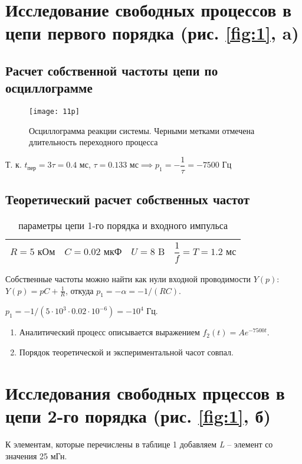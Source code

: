 \documentclass[a4paper,14pt ]{article} %
\begin{document}
\section{Исследование свободных процессов в цепи первого порядка (рис. \ref{fig:1}, a)}
\subsection{Расчет собственной частоты цепи по осциллограмме}
\begin{figure}[H]
    \texttt{[image: 11p]}
    \centering
    \caption{\centering Осциллограмма реакции системы. Черными метками отмечена длительность
    переходного процесса}
\end{figure} Т. к. $t_\text{пер} = 3\tau = 0.4 \text{ мс}$, $\tau = 0.133\text{ мс}
\implies p_1 = -\dfrac{1}{\tau} = -7500\text{ Гц}$
\subsection{Теоретический расчет собственных частот}
\begin{table}[h]
    \centering
    \begin{tabular}{|r|c|c|l|}
        \hline
        $R = 5 \text{ кОм}$ & $C = 0.02 \text{ мкФ} $ & $ U = 8 \text{ B}$ &
        $\dfrac{1}{f} = T = 1.2 \text{ мс} $ \\
        \hline
    \end{tabular}
    \caption{параметры цепи 1-го порядка и входного импульса}
\end{table}
Собственные частоты можно найти как нули входной проводимости $Y(p)$:
$ Y(p) = pC + \frac1R $, откуда $ p_1 = -\alpha = -1/(RC) $.

$p_1 = -1/(5\cdot10^3\cdot0.02\cdot10^{-6}) =  -10^{4}$ Гц.
\begin{enumerate}
    \item Аналитический процесс описывается выражением $f_2(t) = Ae^{-7500t}$.
    \item Порядок теоретической и экспериментальной часот совпал.
\end{enumerate} \newpage
\section{Исследования свободных прцессов в цепи 2-го порядка (рис. \ref{fig:1}, б)}
К элементам, которые перечислены в таблице 1 добавляем {\it L} -- элемент со значения 25 мГн.
\end{document}
